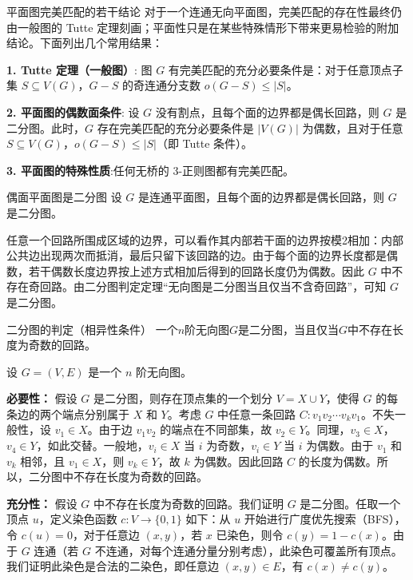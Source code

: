 \begin{theorem}{平面图完美匹配的若干结论}{}
    对于一个连通无向平面图，完美匹配的存在性最终仍由一般图的 Tutte 定理刻画；平面性只是在某些特殊情形下带来更易检验的附加结论。下面列出几个常用结果：

    \textbf{1. Tutte 定理（一般图）}:
    图 $G$ 有完美匹配的充分必要条件是：对于任意顶点子集 $S \subseteq V(G)$，$G-S$ 的奇连通分支数 $o(G-S) \le |S|$。

    \textbf{2. 平面图的偶数面条件}:
    设 $G$ 没有割点，且每个面的边界都是偶长回路，则 $G$ 是二分图。此时，$G$ 存在完美匹配的充分必要条件是 $|V(G)|$ 为偶数，且对于任意 $S \subseteq V(G)$，$o(G-S) \le |S|$（即 Tutte 条件）。

    \textbf{3. 平面图的特殊性质}:任何无桥的 3-正则图都有完美匹配。
\end{theorem}
\begin{theorem}{偶面平面图是二分图}{}
    设 $G$ 是连通平面图，且每个面的边界都是偶长回路，则 $G$ 是二分图。
\end{theorem}
    任意一个回路所围成区域的边界，可以看作其内部若干面的边界按模2相加：内部公共边出现两次而抵消，最后只留下该回路的边。由于每个面的边界长度都是偶数，若干偶数长度边界按上述方式相加后得到的回路长度仍为偶数。因此 $G$ 中不存在奇回路。由二分图判定定理“无向图是二分图当且仅当不含奇回路”，可知 $G$ 是二分图。

\begin{theorem}{二分图的判定（相异性条件）}{}
    一个$n$阶无向图$G$是二分图，当且仅当$G$中不存在长度为奇数的回路。
\end{theorem}
设 $G=(V,E)$ 是一个 $n$ 阶无向图。

    \textbf{必要性：} 假设 $G$ 是二分图，则存在顶点集的一个划分 $V = X \cup Y$，使得 $G$ 的每条边的两个端点分别属于 $X$ 和 $Y$。考虑 $G$ 中任意一条回路 $C: v_1 v_2 \cdots v_k v_1$。不失一般性，设 $v_1 \in X$。由于边 $v_1v_2$ 的端点在不同部集，故 $v_2 \in Y$。同理，$v_3 \in X$，$v_4 \in Y$，如此交替。一般地，$v_i \in X$ 当 $i$ 为奇数，$v_i \in Y$ 当 $i$ 为偶数。由于 $v_1$ 和 $v_k$ 相邻，且 $v_1 \in X$，则 $v_k \in Y$，故 $k$ 为偶数。因此回路 $C$ 的长度为偶数。所以，二分图中不存在长度为奇数的回路。

    \textbf{充分性：} 假设 $G$ 中不存在长度为奇数的回路。我们证明 $G$ 是二分图。任取一个顶点 $u$，定义染色函数 $c: V \to \{0,1\}$ 如下：从 $u$ 开始进行广度优先搜索（BFS），令 $c(u)=0$，对于任意边 $(x,y)$，若 $x$ 已染色，则令 $c(y)=1-c(x)$。由于 $G$ 连通（若 $G$ 不连通，对每个连通分量分别考虑），此染色可覆盖所有顶点。我们证明此染色是合法的二染色，即任意边 $(x,y) \in E$，有 $c(x) \neq c(y)$。

